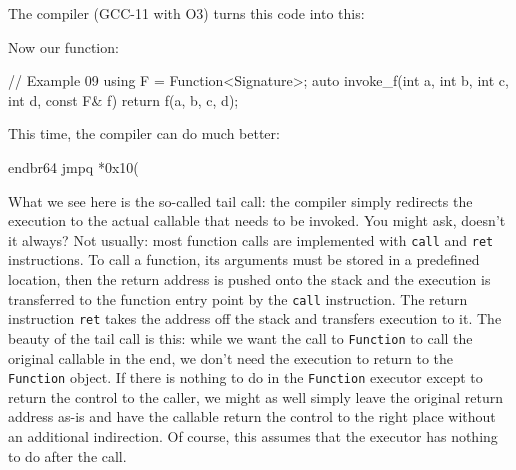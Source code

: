 {The compiler (GCC-11 with O3) turns this code into this:


Now our function:

\begin{code}
// Example 09
using F = Function<Signature>;
auto invoke_f(int a, int b, int c, int d, const F& f) {
  return f(a, b, c, d);
}
\end{code}

This time, the compiler can do much better:

\begin{code}
endbr64
jmpq   *0x10(%
\end{code}

What we see here is the so-called tail call: the compiler simply redirects the execution to the actual callable that needs to be invoked. You might ask, doesn't it always? Not usually: most function calls are implemented with \texttt{call} and \texttt{ret} instructions. To call a function, its arguments must be stored in a predefined location, then the return address is pushed onto the stack and the execution is transferred to the function entry point by the \texttt{call} instruction. The return instruction \texttt{ret} takes the address off the stack and transfers execution to it. The beauty of the tail call is this: while we want the call to \texttt{Function} to call the original callable in the end, we don't need the execution to return to the \texttt{Function} object. If there is nothing to do in the \texttt{Function} executor except to return the control to the caller, we might as well simply leave the original return address as-is and have the callable return the control to the right place without an additional indirection. Of course, this assumes that the executor has nothing to do after the call.

}
